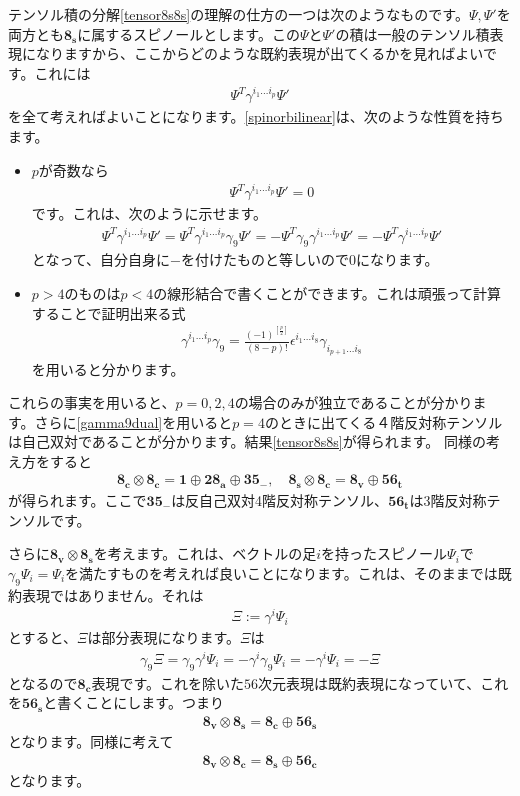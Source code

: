 \documentclass[report,paper=a4, fontsize=12pt, line_length=16cm, number_of_lines=34,dvipdfmx]{jlreq}
\numberwithin{equation}{chapter}
\numberwithin{equation}{section}
\newcommand{\triv}{\mathbf{1}}
\newcommand{\etv}{\mathbf{8_v}}
\newcommand{\ets}{\mathbf{8_s}}
\newcommand{\etc}{\mathbf{8_c}}
\newcommand{\tweta}{\mathbf{28_{a}}}
\newcommand{\thfvm}{\mathbf{35}_{-}}
\newcommand{\fsxt}{\mathbf{56_t}}
\newcommand{\fsxs}{\mathbf{56_s}}
\newcommand{\fsxc}{\mathbf{56_c}}
\begin{document}
テンソル積の分解\eqref{tensor8s8s}の理解の仕方の一つは次のようなものです。$\Psi,\Psi'$を両方とも$\ets$に属するスピノールとします。この$\Psi$と$\Psi'$の積は一般のテンソル積表現になりますから、ここからどのような既約表現が出てくるかを見ればよいです。これには
\begin{align}
  \Psi^{T}\gamma^{i_1\dots i_p}\Psi'
  \label{spinorbilinear}
\end{align}
を全て考えればよいことになります。\eqref{spinorbilinear}は、次のような性質を持ちます。
\begin{itemize}
  \item $p$が奇数なら
  \begin{align}
    \Psi^{T}\gamma^{i_1\dots i_p}\Psi'=0
  \end{align}
  です。これは、次のように示せます。
  \begin{align}
    \Psi^{T}\gamma^{i_1\dots i_p}\Psi'=
    \Psi^{T}\gamma^{i_1\dots i_p}\gamma_9\Psi'=
    -\Psi^{T}\gamma_9\gamma^{i_1\dots i_p}\Psi'=
    -\Psi^{T}\gamma^{i_1\dots i_p}\Psi'
  \end{align}
  となって、自分自身に$-$を付けたものと等しいので$0$になります。
  \item $p>4$のものは$p<4$の線形結合で書くことができます。これは頑張って計算することで証明出来る式
  \begin{align}
    \gamma^{i_1\dots i_p}\gamma_9=\frac{(-1)^{[\frac{p}{2}]}}{(8-p)!}\epsilon^{i_1\dots i_8}\gamma_{i_{p+1}\dots i_8}\label{gamma9dual}
  \end{align}
  を用いると分かります。
\end{itemize}
これらの事実を用いると、$p=0,2,4$の場合のみが独立であることが分かります。さらに\eqref{gamma9dual}を用いると$p=4$のときに出てくる４階反対称テンソルは自己双対であることが分かります。結果\eqref{tensor8s8s}が得られます。
同様の考え方をすると
\begin{align}
  \etc\otimes\etc=\triv \oplus \tweta \oplus \thfvm,\quad
  \ets\otimes\etc=\etv \oplus \fsxt
  \label{otherspinortensors}
\end{align}
が得られます。ここで$\thfvm$は反自己双対4階反対称テンソル、$\fsxt$は3階反対称テンソルです。

さらに$\etv\otimes \ets$を考えます。これは、ベクトルの足$i$を持ったスピノール$\Psi_i$で$\gamma_9 \Psi_i=\Psi_i$を満たすものを考えれば良いことになります。これは、そのままでは既約表現ではありません。それは
\begin{align}
  \Xi:=\gamma^{i}\Psi_i
\end{align}
とすると、$\Xi$は部分表現になります。$\Xi$は
\begin{align}
  \gamma_9\Xi
  =\gamma_9\gamma^{i}\Psi_i
  =-\gamma^{i}\gamma_9\Psi_i
  =-\gamma^{i}\Psi_i
  =-\Xi
\end{align}
となるので$\etc$表現です。これを除いた$56$次元表現は既約表現になっていて、これを$\fsxs$と書くことにします。つまり
\begin{align}
  \etv\otimes \ets=\etc\oplus\fsxs
\end{align}
となります。同様に考えて
\begin{align}
  \etv\otimes \etc=\ets\oplus\fsxc
\end{align}
となります。
\end{document}
